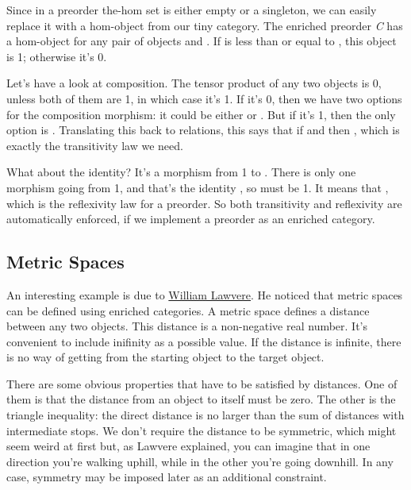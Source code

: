 Since in a preorder the-hom set is either empty or a singleton, we can
easily replace it with a hom-object from our tiny category. The enriched
preorder \emph{C} has a hom-object  for any pair of
objects  and . If  is less than or equal
to , this object is 1; otherwise it's 0.

Let's have a look at composition. The tensor product of any two objects
is 0, unless both of them are 1, in which case it's 1. If it's 0, then
we have two options for the composition morphism: it could be either
 or . But if it's 1, then the only
option is . Translating this back to relations, this says
that if  and  then
, which is exactly the transitivity law we
need.

What about the identity? It's a morphism from 1 to .
There is only one morphism going from 1, and that's the identity
, so  must be 1. It means that
, which is the reflexivity law for a
preorder. So both transitivity and reflexivity are automatically
enforced, if we implement a preorder as an enriched category.

\subsection{Metric Spaces}\label{metric-spaces}

An interesting example is due to
\href{http://www.tac.mta.ca/tac/reprints/articles/1/tr1.pdf}{William
Lawvere}. He noticed that metric spaces can be defined using enriched
categories. A metric space defines a distance between any two objects.
This distance is a non-negative real number. It's convenient to include
inifinity as a possible value. If the distance is infinite, there is no
way of getting from the starting object to the target object.

There are some obvious properties that have to be satisfied by
distances. One of them is that the distance from an object to itself
must be zero. The other is the triangle inequality: the direct distance
is no larger than the sum of distances with intermediate stops. We don't
require the distance to be symmetric, which might seem weird at first
but, as Lawvere explained, you can imagine that in one direction you're
walking uphill, while in the other you're going downhill. In any case,
symmetry may be imposed later as an additional constraint.

